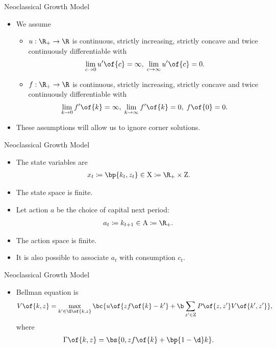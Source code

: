 \documentclass[11pt,xcolor={dvipsnames},aspectratio=159,hyperref={pdftex,pdfpagemode=UseNone,hidelinks,pdfdisplaydoctitle=true},usepdftitle=false]{beamer}
\begin{document}
\begin{frame}{Neoclassical Growth Model}   
    \begin{itemize}
       \item We assume \begin{itemize}
        \item $u: \R_+ \rightarrow \R$ is continuous, strictly increasing, strictly concave and twice continuously differentiable with \begin{align*} \lim_{c\rightarrow 0} u^\prime\of{c} = \infty, \; \lim_{c\rightarrow \infty} u^\prime\of{c} = 0. \end{align*}
        \item $f: \R_+ \rightarrow \R$ is continuous, strictly increasing, strictly concave and twice continuously differentiable with  \begin{align*} \lim_{k\rightarrow 0} f^\prime\of{k} = \infty, \; \lim_{k\rightarrow \infty} f^\prime\of{k} = 0, \; f\of{0} = 0. \end{align*}
       \end{itemize}
       \item These assumptions will allow us to ignore corner solutions.
   \end{itemize}
   \end{frame}
   

   \begin{frame}{Neoclassical Growth Model}   
    \begin{itemize}
       \item The state variables are \begin{align*}
           x_t \coloneq \bp{k_t, z_t} \in \text{X} \coloneq \R_+ \times \text{Z}.
       \end{align*}
    \item The state space is  finite.
    \item Let action $a$ be the choice of capital next period: \begin{align*}
        a_t \coloneq k_{t+1} \in \text{A} \coloneq \R_+.
    \end{align*}
    \item The action space is  finite.
    \item It is also possible to associate $a_t$ with consumption $c_t$.
   \end{itemize}
   \end{frame}

\begin{frame}{Neoclassical Growth Model}
    \begin{itemize}
        \item Bellman equation is \begin{align*}
            V\of{k,z} = \max_{k^\prime \in \G\of{k,z}} \bc{u\of{z f\of{k} - k^\prime} + \b \sum_{z^\prime \in \text{Z}} P\of{z,z^\prime} V\of{k^\prime,z^\prime} },
        \end{align*}
        where \begin{align*}\Gamma\of{k,z} =\bs{0,zf\of{k} + \bp{1-\d}k}.\end{align*}
    \end{itemize}
    \end{frame}
\end{document}
